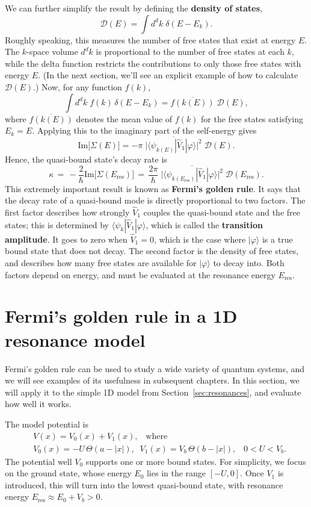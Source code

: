 \documentclass[pra,12pt]{revtex4}
\begin{document}
We can further simplify the result by defining the \textbf{density of
  states},
$$\mathcal{D}(E) = \int d^d k\; \delta(E - E_k).$$
Roughly speaking, this measures the number of free states that exist
at energy $E$.  The $k$-space volume $d^dk$ is proportional to the
number of free states at each $k$, while the delta function restricts
the contributions to only those free states with energy $E$.  (In
the next section, we'll see an explicit example of how to calculate
$\mathcal{D}(E)$.)  Now, for any function $f(k)$,
$$\int d^d k\; f(k) \, \delta(E - E_k) = \overline{f(k(E))} \;\mathcal{D}(E),$$
where $\overline{f(k(E))}$ denotes the mean value of $f(k)$ for the
free states satisfying $E_k = E$.  Applying this to the imaginary part
of the self-energy gives
$$\mathrm{Im}\big[\Sigma(E)\big] = - \pi \; \overline{\Big| \langle\psi_{k(E)}| \hat{V}_1|\varphi\rangle\Big|^2} \; \mathcal{D}(E).$$
Hence, the quasi-bound state's decay rate is
$$\boxed{\quad\kappa \,=\, -\frac{2}{\hbar}\mathrm{Im}\big[\Sigma(E_{\mathrm{res}})\big] \,=\, \frac{2\pi}{\hbar} \; \overline{\Big| \langle\psi_{k(E_{\mathrm{res}})}| \hat{V}_1|\varphi\rangle\Big|^2} \; \mathcal{D}(E_{\mathrm{res}}).\quad}$$
This extremely important result is known as \textbf{Fermi's golden
  rule}.  It says that the decay rate of a quasi-bound mode is
directly proportional to two factors.  The first factor describes how
strongly $\hat{V}_1$ couples the quasi-bound state and the free
states; this is determined by $\langle\psi_{k}|
\hat{V}_1|\varphi\rangle$, which is called the \textbf{transition
  amplitude}.  It goes to zero when $\hat{V}_1 = 0$, which is
the case where $|\varphi\rangle$ is a true bound state that does not
decay.  The second factor is the density of free states, and
describes how many free states are available for $|\varphi\rangle$ to
decay into.  Both factors depend on energy, and must be evaluated at
the resonance energy $E_{\mathrm{res}}$.

\section{Fermi's golden rule in a 1D resonance model}

Fermi's golden rule can be used to study a wide variety of quantum
systems, and we will see examples of its usefulness in subsequent
chapters.  In this section, we will apply it to the simple 1D model
from Section~\ref{sec:resonances}, and evaluate how well it works.

The model potential is
$$\begin{aligned}&V(x) = V_0(x) + V_1(x), \;\;\;\mathrm{where} \\ &V_0(x) = -U \, \Theta(a-|x|), \;\; V_1(x) = V_b\, \Theta(b-|x|), \;\;\; 0<U<V_b.\end{aligned}$$
The potential well $V_0$ supports one or more bound states.  For
simplicity, we focus on the ground state, whose energy $E_0$ lies in
the range $[-U,0]$.  Once $V_1$ is introduced, this will turn into the
lowest quasi-bound state, with resonance energy $E_{\mathrm{res}}
\approx E_0 + V_b > 0$.
\end{document}

